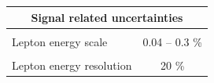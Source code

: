 \begin{table}[!htb]
\begin{center}
\begin{tabular}{|lc|}
			\hline %
			\multicolumn{2}{|c|}{Signal related uncertainties} \\
			\hline %
			\vspace{-0.4cm} & \\
			Lepton energy scale & 0.04 -- 0.3 \% \\ 
			\vspace{-0.4cm} & \\
			Lepton energy resolution & 20 \% \\ 
			\hline %
			\hline %
		\end{tabular}
		\normalsize
	\end{center}
\end{table}



